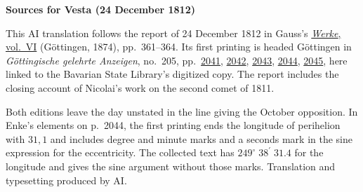 \clearpage\thispagestyle{empty}
\begin{center}\textbf{Sources for Vesta (24 December 1812)}\end{center}
\noindent This AI translation follows the report of 24 December 1812 in Gauss’s \href{https://gdz.sub.uni-goettingen.de/id/PPN236007467}{\textit{Werke}, vol.~VI} (Göttingen, 1874), pp.~361--364. Its first printing is headed Göttingen in \textit{Göttingische gelehrte Anzeigen}, no.~205, pp.~\href{https://api.digitale-sammlungen.de/iiif/image/v2/bsb10538682_01007/full/1600,/0/default.jpg}{2041}, \href{https://api.digitale-sammlungen.de/iiif/image/v2/bsb10538682_01008/full/1600,/0/default.jpg}{2042}, \href{https://api.digitale-sammlungen.de/iiif/image/v2/bsb10538682_01009/full/1600,/0/default.jpg}{2043}, \href{https://api.digitale-sammlungen.de/iiif/image/v2/bsb10538682_01010/full/1600,/0/default.jpg}{2044}, \href{https://api.digitale-sammlungen.de/iiif/image/v2/bsb10538682_01011/full/1600,/0/default.jpg}{2045}, here linked to the Bavarian State Library’s digitized copy. The report includes the closing account of Nicolai’s work on the second comet of 1811.
\par\smallskip\noindent Both editions leave the day unstated in the line giving the October opposition. In Enke’s elements on p.~2044, the first printing ends the longitude of perihelion with $31{,}1$ and includes degree and minute marks and a seconds mark in the sine expression for the eccentricity. The collected text has $249^\circ\;38^{\prime}\;31.4$ for the longitude and gives the sine argument without those marks. Translation and typesetting produced by AI.
\clearpage
